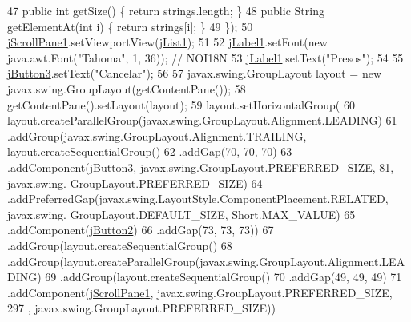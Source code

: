 \begin{DoxyCode}
47             \textcolor{keyword}{public} \textcolor{keywordtype}{int} getSize() \{ \textcolor{keywordflow}{return} strings.length; \}
48             \textcolor{keyword}{public} String getElementAt(\textcolor{keywordtype}{int} i) \{ \textcolor{keywordflow}{return} strings[i]; \}
49         \});
50         \mbox{\hyperlink{classinterfacessoguar_1_1paenrilarriconboxex_a37efb18a476b6d2b02f2181ef12a7bf7}{jScrollPane1}}.setViewportView(\mbox{\hyperlink{classinterfacessoguar_1_1paenrilarriconboxex_aafe6499bef73e1ae5162f2909227f93d}{jList1}});
51 
52         \mbox{\hyperlink{classinterfacessoguar_1_1paenrilarriconboxex_a183fb515416e9f28b873f438feb9bd96}{jLabel1}}.setFont(\textcolor{keyword}{new} java.awt.Font(\textcolor{stringliteral}{"Tahoma"}, 1, 36)); \textcolor{comment}{// NOI18N}
53         \mbox{\hyperlink{classinterfacessoguar_1_1paenrilarriconboxex_a183fb515416e9f28b873f438feb9bd96}{jLabel1}}.setText(\textcolor{stringliteral}{"Presos"});
54 
55         \mbox{\hyperlink{classinterfacessoguar_1_1paenrilarriconboxex_ab9e110160eea74109e1ac28fcf342a44}{jButton3}}.setText(\textcolor{stringliteral}{"Cancelar"});
56 
57         javax.swing.GroupLayout layout = \textcolor{keyword}{new} javax.swing.GroupLayout(getContentPane());
58         getContentPane().setLayout(layout);
59         layout.setHorizontalGroup(
60             layout.createParallelGroup(javax.swing.GroupLayout.Alignment.LEADING)
61             .addGroup(javax.swing.GroupLayout.Alignment.TRAILING, layout.createSequentialGroup()
62                 .addGap(70, 70, 70)
63                 .addComponent(\mbox{\hyperlink{classinterfacessoguar_1_1paenrilarriconboxex_ab9e110160eea74109e1ac28fcf342a44}{jButton3}}, javax.swing.GroupLayout.PREFERRED\_SIZE, 81, javax.swing.
      GroupLayout.PREFERRED\_SIZE)
64                 .addPreferredGap(javax.swing.LayoutStyle.ComponentPlacement.RELATED, javax.swing.
      GroupLayout.DEFAULT\_SIZE, Short.MAX\_VALUE)
65                 .addComponent(\mbox{\hyperlink{classinterfacessoguar_1_1paenrilarriconboxex_ada9e272c25f98b59277bf1cc3d87e89d}{jButton2}})
66                 .addGap(73, 73, 73))
67             .addGroup(layout.createSequentialGroup()
68                 .addGroup(layout.createParallelGroup(javax.swing.GroupLayout.Alignment.LEADING)
69                     .addGroup(layout.createSequentialGroup()
70                         .addGap(49, 49, 49)
71                         .addComponent(\mbox{\hyperlink{classinterfacessoguar_1_1paenrilarriconboxex_a37efb18a476b6d2b02f2181ef12a7bf7}{jScrollPane1}}, javax.swing.GroupLayout.PREFERRED\_SIZE, 297
      , javax.swing.GroupLayout.PREFERRED\_SIZE))

\end{DoxyCode}
